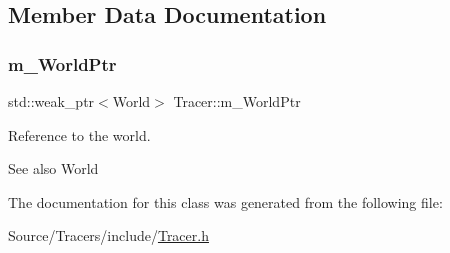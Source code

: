 \subsection{Member Data Documentation}
\hypertarget{class_tracer_a0fc389376b5ab36e08fd8e1f6ea16450}{}\label{class_tracer_a0fc389376b5ab36e08fd8e1f6ea16450} 
\subsubsection{\texorpdfstring{m\+\_\+\+World\+Ptr}{m\_WorldPtr}}
{\footnotesize\ttfamily std\+::weak\+\_\+ptr$<$World$>$ Tracer\+::m\+\_\+\+World\+Ptr\hspace{0.3cm}{\ttfamily [protected]}}

Reference to the world. \begin{DoxySeeAlso}{See also}
World 
\end{DoxySeeAlso}


The documentation for this class was generated from the following file\+:\begin{DoxyCompactItemize}
\item 
Source/\+Tracers/include/\hyperlink{_tracer_8h}{Tracer.\+h}\end{DoxyCompactItemize}
